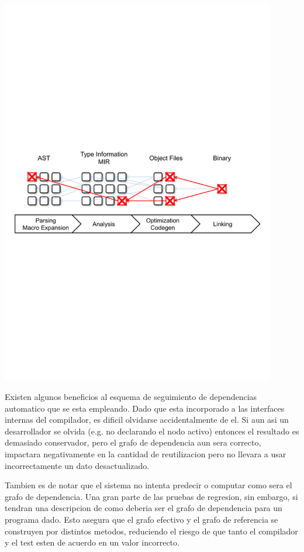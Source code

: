 \documentclass[12pt, a4paper]{report}
\begin{document}
    \noindent
    \includegraphics[width=0.9\textwidth]{woe16_compiler_cache_purge}

    Existen algunos beneficios al esquema de seguimiento de dependencias automatico que se esta empleando.
    Dado que esta incorporado a las interfaces internas del compilador, es dificil olvidarse accidentalmente de el.
    Si aun asi un desarrollador se olvida (e.g. no declarando el nodo activo) entonces el resultado es demasiado conservador, pero el grafo de dependencia aun sera correcto, impactara negativamente en la cantidad de reutilizacion pero no llevara a usar incorrectamente un dato desactualizado.
    \cite{rust_blog_incremental_compilation}

    Tambien es de notar que el sistema no intenta predecir o computar como sera el grafo de dependencia.
    Una gran parte de las pruebas de regresion, sin embargo, si tendran una descripcion de como deberia ser el grafo de dependencia para un programa dado.
    Esto asegura que el grafo efectivo y el grafo de referencia se construyen por distintos metodos, reduciendo el riesgo de que tanto el compilador y el test esten de acuerdo en un valor incorrecto.
    \cite{rust_blog_incremental_compilation}
\end{document}
